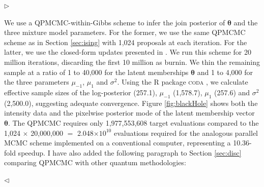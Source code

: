 \documentclass[12pt]{article}
\newenvironment{reply}{$\triangleright$\bfseries}{$\triangleleft$}
\renewenvironment{quote}
               {\list{}{\rightmargin\leftmargin}%
                \item\relax\normalfont}
               {\endlist}
\newcommand{\ttheta}{\boldsymbol{\theta}}
\begin{document}
\begin{reply}
\begin{quote}
		We use a QPMCMC-within-Gibbs scheme to infer the join posterior of $\ttheta$ and the three mixture model parameters.  For the former, we use the same QPMCMC scheme as in Section \ref{sec:ising} with 1,024 proposals at each iteration. For the latter, we use the closed-form updates presented in \citet{hurn1997difficulties}.  We run this scheme for 20 million iterations, discarding the first 10 million as burnin.  We thin the remaining sample at a ratio of 1 to 40,000 for the latent memberships $\ttheta$ and 1 to 4,000 for the three parameters $\mu_{-1}$, $\mu_1$ and $\sigma^2$.  Using the \textsc{R} package \textsc{coda} \citep{coda}, we calculate effective sample sizes of the log-posterior (257.1), $\mu_{-1}$ (1,578.7), $\mu_1$ (257.6) and $\sigma^2$ (2,500.0), suggesting adequate convergence.   Figure \ref{fig:blackHole} shows both the intensity data and the pixelwise posterior mode of the latent membership vector $\ttheta$.  The QPMCMC requires only 1,977,553,608 target evaluations compared to the 1,024 $\times$ 20,000,000 $=$ 2.048$\times10^{10}$ evaluations required for the analogous parallel MCMC scheme implemented on a conventional computer, representing a 10.36-fold speedup.
	\end{quote}
	I have also added the following paragraph to Section \ref{sec:disc} comparing QPMCMC with other quantum methodologies:
	\begin{quote}

\end{quote}
\end{reply}
\end{document}

